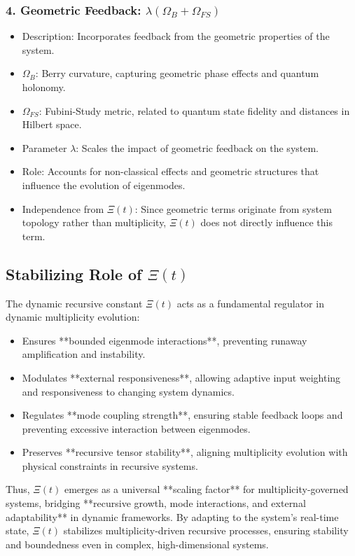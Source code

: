 \documentclass{article}
\theoremstyle{plain}
\begin{document}
\begin{itemize}
\subsubsection{4. Geometric Feedback: \( \lambda (\Omega_B + \Omega_{FS}) \)}
\begin{itemize}
    \item Description: Incorporates feedback from the geometric properties of the system.
    \item \( \Omega_B \): Berry curvature, capturing geometric phase effects and quantum holonomy.
    \item \( \Omega_{FS} \): Fubini-Study metric, related to quantum state fidelity and distances in Hilbert space.
    \item Parameter \( \lambda \): Scales the impact of geometric feedback on the system.
    \item Role: Accounts for non-classical effects and geometric structures that influence the evolution of eigenmodes.
    \item Independence from \(\Xi(t) \): Since geometric terms originate from system topology rather than multiplicity, \(\Xi(t) \) does not directly influence this term.
\end{itemize}

\subsection{Stabilizing Role of \(\Xi(t) \)}

The dynamic recursive constant \(\Xi(t) \) acts as a fundamental regulator in dynamic multiplicity evolution:

\begin{itemize}
    \item Ensures **bounded eigenmode interactions**, preventing runaway amplification and instability.
    \item Modulates **external responsiveness**, allowing adaptive input weighting and responsiveness to changing system dynamics.
    \item Regulates **mode coupling strength**, ensuring stable feedback loops and preventing excessive interaction between eigenmodes.
    \item Preserves **recursive tensor stability**, aligning multiplicity evolution with physical constraints in recursive systems.
\end{itemize}

Thus, \(\Xi(t) \) emerges as a universal **scaling factor** for multiplicity-governed systems, bridging **recursive growth, mode interactions, and external adaptability** in dynamic frameworks. By adapting to the system's real-time state, \(\Xi(t) \) stabilizes multiplicity-driven recursive processes, ensuring stability and boundedness even in complex, high-dimensional systems.




\end{itemize}
\end{document}

